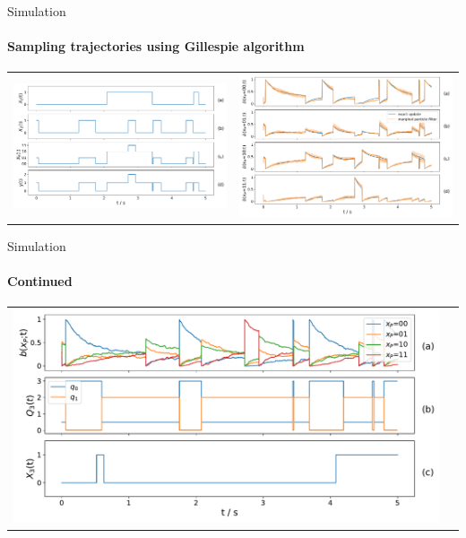\documentclass[
	english,%
	aspectratio=169,%
	color={accentcolor=3b},
	logo=true,%
	colorframetitle=false,%
	]{tudabeamer}
\begin{document}
\begin{frame}{Simulation}
\framesubtitle{Sampling trajectories using Gillespie algorithm}
\vspace{12pt}
\begin{tabular}{cc}
	\includegraphics[height=0.6\textheight]{figures/parent_traj}
	&
	\includegraphics[height=0.6\textheight]{figures/belief_traj}
\end{tabular}
\end{frame}


\begin{frame}{Simulation}
\framesubtitle{Continued}
\centering
\begin{tabular}{cc}
	\includegraphics[height=0.7\textheight]{figures/q_traj}
\end{tabular}
\end{frame}
\end{document}
